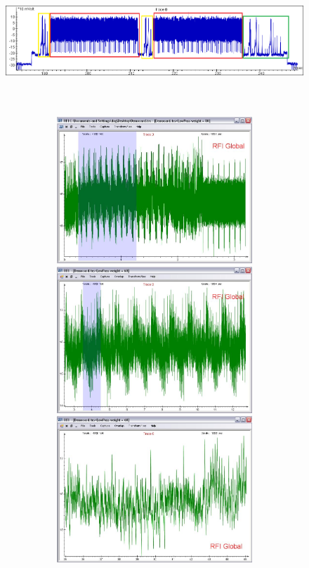 	\newpage
		\begin{figure}[h]
		\begin{center}
	       		\includegraphics[width=18cm,height=5.5cm]{images/fullrsa.png}\\			\vspace{5mm}
	       		\includegraphics[width=18cm,height=5.5cm]{images/1.JPG}\\				\vspace{5mm}
	       		\includegraphics[width=18cm,height=5.5cm]{images/2.JPG}\\				\vspace{5mm}
	       		\includegraphics[width=18cm,height=5.5cm]{images/3.JPG}\\	
		\end{center}
		\end{figure}
	\newpage
	\tableofcontents

